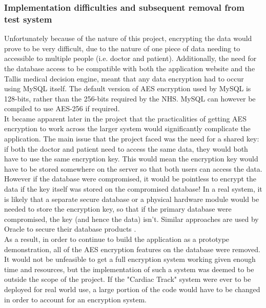 \documentclass[11pt]{article}
\begin{document}
\subsubsection{Implementation difficulties and subsequent removal from test system}

Unfortunately because of the nature of this project, encrypting the data would prove to be very difficult, due to the nature of one piece of data needing to accessible to multiple people (i.e. doctor and patient). Additionally, the need for the database access to be compatible with both the application website and the Tallis medical decision engine, meant that any data encryption had to occur using MySQL itself. The default version of AES encryption used by MySQL is 128-bits, rather than the 256-bits required by the NHS. MySQL can however be compiled to use AES-256 if required.
\\ \indent
It became apparent later in the project that the practicalities of getting AES encryption to work across the larger system would significantly complicate the application. The main issue that the project faced was the need for a shared key: if both the doctor and patient need to access the same data, they would both have to use the same encryption key. This would mean the encryption key would have to be stored somewhere on the server so that both users can access the data. However if the  database were compromised, it would be pointless to encrypt the data if the key itself was stored on the compromised database! In a real system, it is likely that a separate secure database or a physical hardware module would be needed to store the encryption key, so that if the primary database were compromised, the key (and hence the data) isn't. Similar approaches are used by Oracle to secure their database products \cite[section 3.1.3]{oracle:keymanagement}.
\\ \indent
As a result, in order to continue to build the application as a prototype demonstration, all of the AES encryption features on the database were removed. It would not be unfeasible to get a full encryption system working given enough time and resources, but the implementation of such a system was deemed to be outside the scope of the project. If the "Cardiac Track" system were ever to be deployed for real world use, a large portion of the code would have to be changed in order to account for an encryption system.
\end{document}
